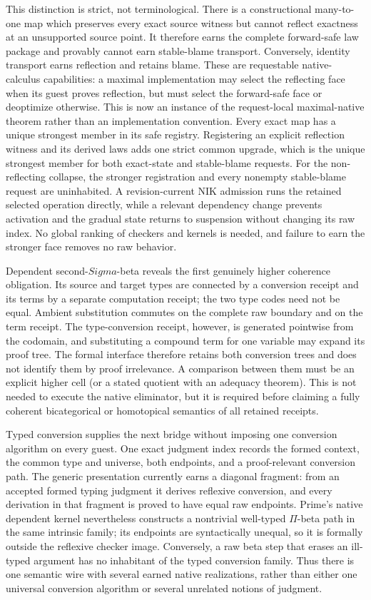 \documentclass[11pt]{article}
\begin{document}
This distinction is strict, not terminological.  There is a constructional
many-to-one map which preserves every exact source witness but cannot reflect
exactness at an unsupported source point.  It therefore earns the complete
forward-safe law package and provably cannot earn stable-blame transport.
Conversely, identity transport earns reflection and retains blame.  These are
requestable native-calculus capabilities: a maximal implementation may select
the reflecting face when its guest proves reflection, but must select the
forward-safe face or deoptimize otherwise.  This is now an instance of the
request-local maximal-native theorem rather than an implementation convention.
Every exact map has a unique strongest member in its safe registry.  Registering
an explicit reflection witness and its derived laws adds one strict common
upgrade, which is the unique strongest member for both exact-state and
stable-blame requests.  For the non-reflecting collapse, the stronger
registration and every nonempty stable-blame request are uninhabited.  A
revision-current NIK admission runs the retained selected operation directly,
while a relevant dependency change prevents activation and the gradual state
returns to suspension without changing its raw index.  No global ranking of
checkers and kernels is needed, and failure to earn the stronger face removes
no raw behavior.

Dependent second-$Sigma$-beta reveals the first genuinely higher coherence
obligation.  Its source and target types are connected by a conversion receipt
and its terms by a separate computation receipt; the two type codes need not be
equal.  Ambient substitution commutes on the complete raw boundary and on the
term receipt.  The type-conversion receipt, however, is generated pointwise from
the codomain, and substituting a compound term for one variable may expand its
proof tree.  The formal interface therefore retains both conversion trees and
does not identify them by proof irrelevance.  A comparison between them must be
an explicit higher cell (or a stated quotient with an adequacy theorem).  This
is not needed to execute the native eliminator, but it is required before
claiming a fully coherent bicategorical or homotopical semantics of all retained
receipts.

Typed conversion supplies the next bridge without imposing one conversion
algorithm on every guest.  One exact judgment index records the formed context,
the common type and universe, both endpoints, and a proof-relevant conversion
path.  The generic presentation currently earns a diagonal fragment: from an
accepted formed typing judgment it derives reflexive conversion, and every
derivation in that fragment is proved to have equal raw endpoints.  Prime's
native dependent kernel nevertheless constructs a nontrivial well-typed
$\Pi$-beta path in the same intrinsic family; its endpoints are syntactically
unequal, so it is formally outside the reflexive checker image.  Conversely, a
raw beta step that erases an ill-typed argument has no inhabitant of the typed
conversion family.  Thus there is one semantic wire with several earned native
realizations, rather than either one universal conversion algorithm or several
unrelated notions of judgment.
\end{document}
